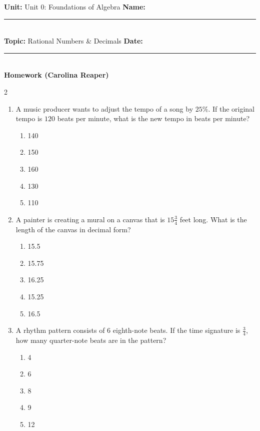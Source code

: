 \documentclass[10pt]{article}
\begin{document}
\enlargethispage{2.5cm}

\begin{tcolorbox}[colback=mainblue!5, colframe=mainblue, sharp corners, boxrule=0.5pt]
    \small \textbf{Unit:} Unit 0: Foundations of Algebra \hfill \textbf{Name:} \rule{3cm}{0.4pt} \\
    \small \textbf{Topic:} Rational Numbers & Decimals \hfill \textbf{Date:} \rule{2cm}{0.4pt} \\
    \centering \textbf{\large Homework (Carolina Reaper)}
\end{tcolorbox}

\vspace{0.2cm}

\begin{multicols}{2}
\begin{enumerate}[label=\textbf{Q\arabic*.}, leftmargin=*, itemsep=6pt, parsep=0pt]

  \item \small A music producer wants to adjust the tempo of a song by $25\%$. If the original tempo is $120$ beats per minute, what is the new tempo in beats per minute?
  \begin{enumerate}[label=(\Alph*), leftmargin=0.6cm, nosep, itemsep=2pt]
    \item 140
    \item 150
    \item 160
    \item 130
    \item 110
  \end{enumerate}

  \item \small A painter is creating a mural on a canvas that is $15 \frac{3}{4}$ feet long. What is the length of the canvas in decimal form?
  \begin{enumerate}[label=(\Alph*), leftmargin=0.6cm, nosep, itemsep=2pt]
    \item 15.5
    \item 15.75
    \item 16.25
    \item 15.25
    \item 16.5
  \end{enumerate}

  \item \small A rhythm pattern consists of $6$ eighth-note beats. If the time signature is $\frac{3}{4}$, how many quarter-note beats are in the pattern?
  \begin{enumerate}[label=(\Alph*), leftmargin=0.6cm, nosep, itemsep=2pt]
    \item 4
    \item 6
    \item 8
    \item 9
    \item 12
  \end{enumerate}


\end{enumerate}
\end{multicols}
\end{document}
